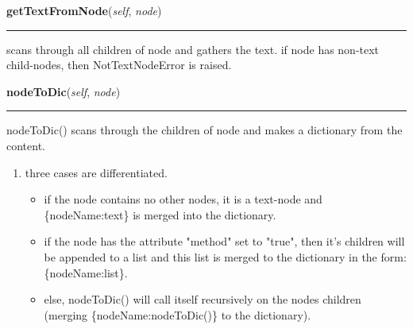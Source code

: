 \hspace{.8\funcindent}\begin{boxedminipage}{\funcwidth}

    \raggedright \textbf{getTextFromNode}(\textit{self}, \textit{node})

    \vspace{-1.5ex}

    \rule{\textwidth}{0.5\fboxrule}
\setlength{\parskip}{2ex}
    scans through all children of node and gathers the text. if node has 
    non-text child-nodes, then NotTextNodeError is raised.

\setlength{\parskip}{1ex}
    \end{boxedminipage}

    \label{cuon:XML:MyXML:MyXML:nodeToDic}

    \vspace{0.5ex}

\hspace{.8\funcindent}\begin{boxedminipage}{\funcwidth}

    \raggedright \textbf{nodeToDic}(\textit{self}, \textit{node})

    \vspace{-1.5ex}

    \rule{\textwidth}{0.5\fboxrule}
\setlength{\parskip}{2ex}
    nodeToDic() scans through the children of node and makes a dictionary 
    from the content.

    \begin{enumerate}

    \setlength{\parskip}{0.5ex}
      \item three cases are differentiated.

        \begin{itemize}
        \setlength{\parskip}{0.6ex}
          \item if the node contains no other nodes, it is a text-node and 
            \{nodeName:text\} is merged into the dictionary.

          \item if the node has the attribute "method" set to "true", then it's
            children will be appended to a list and this list is merged to 
            the dictionary in the form: \{nodeName:list\}.

          \item else, nodeToDic() will call itself recursively on the nodes 
            children (merging \{nodeName:nodeToDic()\} to the dictionary).

        \end{itemize}

    \end{enumerate}

\setlength{\parskip}{1ex}
    \end{boxedminipage}

